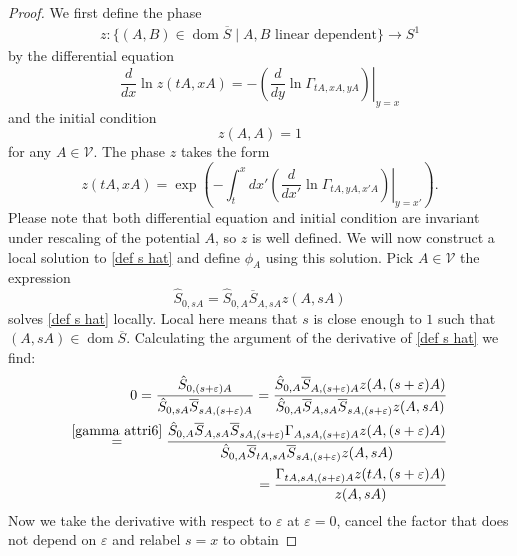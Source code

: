 \documentclass[b5paper,draft,openbib,12pt]{memoir}
\DeclareMathOperator{\dom}{dom}
\begin{document}
\begin{proof}
We first define the phase
\begin{align}
z:\{(A,B)\in\dom\overline{S}\mid A, B \text{ linear dependent}\} \rightarrow S^1
\end{align}
by the differential equation
\begin{equation}
\frac{d}{d x} \ln z(t A, x A) = - \left.\left( \frac{d}{dy} \ln \Gamma_{tA,x A, yA}\right)\right|_{y=x}
\end{equation}
and the initial condition 
\begin{equation}\label{z initial}
z(A,A)=1
\end{equation}
 for any \(A\in \mathcal{V}\). The phase \(z\) takes the form
\begin{equation}
z(tA,xA)=\exp\left(-\int_{t}^x dx' \left.\left( \frac{d}{dx'} \ln \Gamma_{tA,y A, x' A}\right)\right|_{y=x'}\right).
\end{equation}
Please note that both differential equation and initial condition are invariant under rescaling of the potential \(A\), so \(z\) is well defined. 
We will now construct a local solution to \eqref{def s hat} and define \(\phi_A\) using this solution.
Pick \(A\in \mathcal{V}\) the expression
\begin{equation}\label{loc s hat}
\hat{S}_{0,s A} = \hat{S}_{0, A} \overline{S}_{ A, s A} z( A, s A)
\end{equation}
solves \eqref{def s hat} locally. Local here means that \(s\) is close enough to \(1\) such that \(( A, s A)\in\dom\overline{S}\).
Calculating the argument of the derivative of \eqref{def s hat} we find:
\begin{align}
0= \frac{\hat{S}_{0,(s+\varepsilon) A}}{\hat{S}_{0,s A}\overline{S}_{s A, (s+\varepsilon)A}}
= \frac{\hat{S}_{0,A} \overline{S}_{A, (s+\varepsilon)A} z(A, (s+\varepsilon)A)}
{\hat{S}_{0, A} \overline{S}_{ A, s A} \overline{S}_{s A,(s+\varepsilon)}z( A, s A)}\\
\overset{\eqref{gamma attri6}}{=}
 \frac{\hat{S}_{0,A}\overline{S}_{ A, s A} \overline{S}_{s A,(s+\varepsilon)} \Gamma_{A, sA, (s+\varepsilon)A} z(A, (s+\varepsilon)A)}
{\hat{S}_{0, A} \overline{S}_{t A, s A} \overline{S}_{s A,(s+\varepsilon)}z( A, s A)}\\
= \frac{\Gamma_{tA,sA,(s+\varepsilon)A}z(tA, (s+\varepsilon)A)}{z( A, sA)}
\end{align}
Now we take the derivative with respect to \(\varepsilon\) at \(\varepsilon=0\), 
cancel the factor that does not depend on \(\varepsilon\) and relabel \(s=x\) to obtain

\end{proof}
\end{document}
